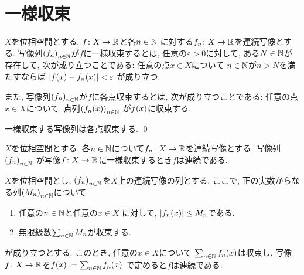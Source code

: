 \documentclass[uplatex, dvipdfmx, a4paper, 12pt, class=jsbook, crop=false]{standalone}
\begin{document}
\section{一様収束}
\label{sec:uniform-convergence}

\begin{definition}
	\( X \)を位相空間とする.
	\( f\colon X\to\mathbb{R} \)と各\( n \in \mathbb{N} \)
	に対する\( f_n\colon X\to\mathbb{R} \)を連続写像とする.
	写像列\( \lrparen{f_n}_{n \in \N} \)が\( f \)に一様収束するとは,
	任意の\( \varepsilon > 0 \)に対して,
	ある\( N \in \mathbb{N} \)が存在して,
	次が成り立つことである:
	任意の点\( x \in X \)について
	\( n \in \mathbb{N} \)が$ n > N $を満たすならば
	\( \abs{\mappt{f}{x} - \mappt{f_n}{x}} < \varepsilon \)
	が成り立つ.

	また, 写像列$ \lrparen{f_n}_{n \in \N} $が$ f $に各点収束するとは,
	次が成り立つことである:
	任意の点\( x \in X \)について,
	点列\( \lrparen{f_n(x)}_{n \in \N} \)
	が\( \mappt{f}{x} \)に収束する.
\end{definition}

\begin{proposition}
	\label{uc00001}
	一様収束する写像列は各点収束する.
	\qed
\end{proposition}

\begin{proposition}
	\label{uc00002}
	\( X \)を位相空間とする.
	各\( n \in \mathbb{N} \)について\( f_n\colon X\to\mathbb{R} \)を連続写像とする.
	写像列\( \lrparen{f_n}_{n \in \N} \)
	が写像\( f\colon X\to\mathbb{R} \)に一様収束するとき\( f \)は連続である.
\end{proposition}

\begin{theorem}
	\( X \)を位相空間とし,
	\( \lrparen{f_n}_{n \in \N} \)を\( X \)上の連続写像の列とする.
	ここで, 正の実数からなる列\( \lrparen{M_n}_{n \in \N} \)について
	\begin{enumerate}
		\item 任意の\( n \in \mathbb{N} \)と任意の\( x \in X \)
		に対して, \( \abs{\mappt{f_n}{x}} \leq M_n \)である.
		\item 無限級数\( \sum_{n \in \mathbb{N}} M_n \)が収束する.
	\end{enumerate}
	が成り立つとする.
	このとき, 任意の\( x \in X \)について
	\( \sum_{n \in \N} \mappt{f_n}{x} \)は収束し,
	写像\( f\colon X\to\mathbb{R} \)を\( \mappt{f}{x}
	\defeq \sum_{n \in \N} \mappt{f_n}{x} \)
	で定めると\( f \)は連続である.
\end{theorem}
\end{document}
